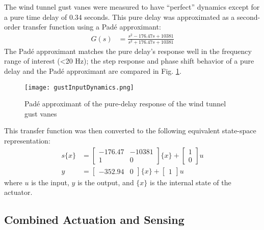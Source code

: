 The wind tunnel gust vanes were measured to have ``perfect'' dynamics except for a pure time delay of 0.34 seconds. This pure delay was approximated as a second-order transfer function using a Pad\'e approximant:
\begin{align}
    G(s) &= \frac{s^2 - 176.47s + 10381}{s^2 + 176.47s + 10381}
\end{align}
The Pad\'e approximant matches the pure delay's response well in the frequency range of interest (<20 Hz); the step response and phase shift behavior of a pure delay and the Pad\'e approximant are compared in Fig. \ref{fig:padeApprox}.
\begin{figure}[H]
    \centering
    \texttt{[image: gustInputDynamics.png]}
    \label{fig:padeApprox}
    \caption{Pad\'e approximant of the pure-delay response of the wind tunnel gust vanes}
\end{figure}
This transfer function was then converted to the following equivalent state-space representation:
\begin{equation}
\begin{aligned}
\label{eq:gustModel}
    s\{x\} &= \begin{bmatrix} -176.47 & -10381 \\ 1 & 0 \end{bmatrix} \{x\}
        + \begin{bmatrix} 1 \\ 0 \end{bmatrix} u \\
    y &= \begin{bmatrix} -352.94 & 0 \end{bmatrix} \{x\}
        + \begin{bmatrix} 1 \end{bmatrix} u
\end{aligned}
\end{equation}
where $u$ is the input, $y$ is the output, and $\{x\}$ is the internal state of the actuator.

\subsection{Combined Actuation and Sensing} %

